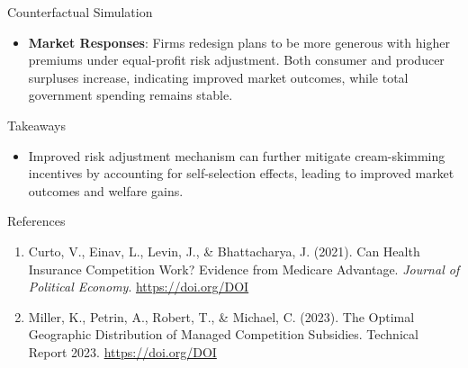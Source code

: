 \documentclass{beamer}
\begin{document}
\begin{frame}[t]
\begin{columns}[t]
\begin{column}{.45\textwidth}
\begin{block}{Counterfactual Simulation}
        \begin{itemize}
          \item \textbf{Market Responses}: Firms redesign plans to be more generous with higher premiums under equal-profit risk adjustment.
          Both consumer and producer surpluses increase, indicating improved market outcomes, while total government spending remains stable.    
        \end{itemize}     
      \end{block}
      \begin{block}{Takeaways}
        \begin{itemize}
          \item Improved risk adjustment mechanism can further mitigate cream-skimming incentives by accounting for self-selection effects, leading to improved market outcomes and welfare gains.
        \end{itemize}
      \end{block}
      \begin{block}{References}
        \begin{enumerate}
          \item Curto, V., Einav, L., Levin, J., \& Bhattacharya, J. (2021). Can Health Insurance Competition Work? Evidence from Medicare Advantage. \textit{Journal of Political Economy}. \href{https://doi.org/DOI}{https://doi.org/DOI}
          \item Miller, K., Petrin, A., Robert, T., \& Michael, C. (2023). The Optimal Geographic Distribution of Managed Competition Subsidies. Technical Report 2023. \href{https://doi.org/DOI}{https://doi.org/DOI}
      \end{enumerate}
      \end{block}
    \end{column}
  
  \end{columns}
\end{frame}
\end{document}
